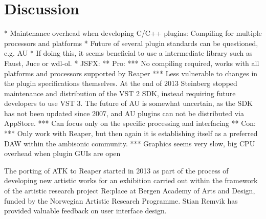 \documentclass{article}
\begin{document}
\section{Discussion}\label{sec:discussion}

* Maintenance overhead when developing C/C++ plugins: Compiling for multiple processors and platforms
* Future of several plugin standards can be questioned, e.g. AU
* If doing this, it seems beneficial to use a intermediate library such as Faust, Juce or wdl-ol.
* JSFX: 
** Pro:
*** No compiling required, works with all platforms and processors supported by Reaper
*** Less vulnerable to changes in the plugin specifications themselves. At the end of 2013 Steinberg stopped maintenance and distribution of the VST 2 SDK, instead requiring future developers to use VST 3. The future of AU is somewhat uncertain, as the SDK has not been updated since 2007, and AU plugins can not be distributed via AppStore.
*** Can focus only on the specific processing and interfacing 
** Con:
*** Only work with Reaper, but then again it is establishing itself as a preferred DAW within the ambisonic community.
*** Graphics seems very slow, big CPU overhead when plugin GUIs are open




\begin{acknowledgments}
The porting of ATK to Reaper started in 2013 as part of the process of developing new artistic works for an exhibition carried out within the framework of the artistic research project Re:place at Bergen Academy of Arts and Design, funded by the Norwegian Artistic Research Programme.
Stian Remvik has provided valuable feedback on user interface design.
\end{acknowledgments} 


\end{document}
